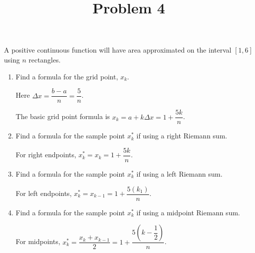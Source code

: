\documentclass{ximera}
\title[Problem 4]{Problem 4}
\begin{document}
\begin{abstract} \end{abstract}
\maketitle


\begin{problem}
	A positive continuous function will have area approximated on the interval $[1, 6]$ using $n$ rectangles. 
	\begin{enumerate}
		\item Find a formula for the grid point, $x_k$. 
	
			\begin{explanation}
				Here $\Delta x = \dfrac{b-a}{n} = \dfrac{5}{n}$. 
				
				The basic grid point formula is $x_k = a + k \Delta x = 1 + \dfrac{5k}{n}$.
			\end{explanation}
\item Find a formula for the sample point $x_k^*$ if using a right Riemann sum.
			\begin{explanation}
				For right endpoints, $x^*_k = x_{k}  = 1 + \dfrac{5k}{n}$.
			\end{explanation}
\item Find a formula for the sample point $x_k^*$ if using a left Riemann sum.
			\begin{explanation}
				For left endpoints, $x^*_k = x_{k-1}  = 1 + \dfrac{5(k_1)}{n}$.
			\end{explanation}
\item Find a formula for the sample point $x_k^*$ if using a midpoint Riemann sum.
			\begin{explanation}
				For midpoints, $x^*_k = \dfrac{x_{k}+x_{k-1}}{2}  = 1 + \dfrac{5(k-\dfrac{1}{2})}{n}$.
			\end{explanation}
\end{enumerate}
\end{problem}
\end{document}
